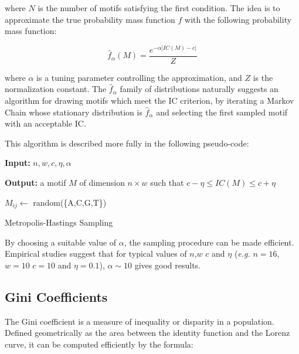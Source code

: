 \documentclass{article}
\renewcommand{\KwData}{\textbf{Input: }}
\renewcommand{\KwResult}{\textbf{Output: }}
\begin{document}
where $N$ is the number of motifs satisfying the first condition.  The
idea is to approximate the true probability mass function $f$ with the
following probability mass function:

\begin{equation}
  \label{eq:approx_uniform}
  \hat f_\alpha(M) = \frac{e^{-\alpha |IC(M)-c|}}{Z}
\end{equation}

where $\alpha$ is a tuning parameter controlling the approximation,
and $Z$ is the normalization constant.  The $\hat f_\alpha$ family of
distributions naturally suggests an algorithm for drawing motifs which
meet the IC criterion, by iterating a Markov Chain whose stationary
distribution is $\hat f_\alpha$ and selecting the first sampled motif
with an acceptable IC. 

This algorithm is described more fully in the following pseudo-code: 

\begin{algorithm}[H]
 \SetLine
 \KwData{$n,w,c,\eta,\alpha$}

 \KwResult{a motif $M$ of dimension $n\times w$ such that $c - \eta \leq IC(M)\leq c + \eta$}

 \For{$i \in [0,n)$}
 {\For{$j \in [0,w)$}
   {$M_{ij}\leftarrow$ random(\{A,C,G,T\})}
 }
 
 \caption{Metropolis-Hastings Sampling}
 \label{alg:mh_motif}
\end{algorithm}

By choosing a suitable value of $\alpha$, the sampling procedure can
be made efficient.  Empirical studies suggest that for typical values
of $n$,$w$ $c$ and $\eta$ (\textit{e.g.} $n=16$,$w=10$ $c=10$ and
$\eta =0.1$), $\alpha\sim 10$ gives good results.

\subsection{Gini Coefficients}
The Gini coefficient is a measure of inequality or disparity in a
population.  Defined geometrically as the area between the identity
function and the Lorenz curve, it can be computed efficiently by the formula:
\end{document}
